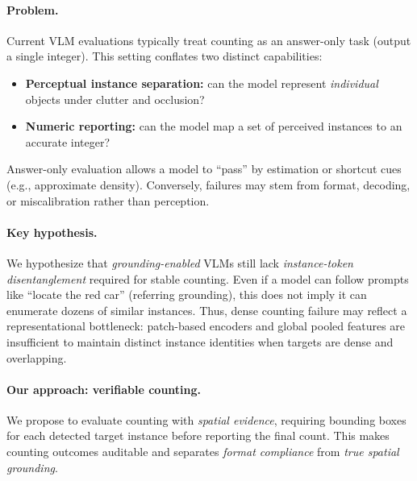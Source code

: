 \documentclass[10pt]{article}
\begin{document}
\paragraph{Problem.}
Current VLM evaluations typically treat counting as an answer-only task (output a single integer).
This setting conflates two distinct capabilities:
\begin{itemize}[leftmargin=1.2em]
  \item \textbf{Perceptual instance separation:} can the model represent \emph{individual} objects under clutter and occlusion?
  \item \textbf{Numeric reporting:} can the model map a set of perceived instances to an accurate integer?
\end{itemize}
Answer-only evaluation allows a model to ``pass'' by estimation or shortcut cues (e.g., approximate density).
Conversely, failures may stem from format, decoding, or miscalibration rather than perception.

\paragraph{Key hypothesis.}
We hypothesize that \emph{grounding-enabled} VLMs still lack \emph{instance-token disentanglement} required for stable counting.
Even if a model can follow prompts like ``locate the red car'' (referring grounding), this does not imply it can enumerate dozens of similar instances.
Thus, dense counting failure may reflect a representational bottleneck: patch-based encoders and global pooled features are insufficient to maintain distinct instance identities when targets are dense and overlapping.

\paragraph{Our approach: verifiable counting.}
We propose to evaluate counting with \emph{spatial evidence}, requiring bounding boxes for each detected target instance before reporting the final count.
This makes counting outcomes auditable and separates \emph{format compliance} from \emph{true spatial grounding}.
\end{document}
